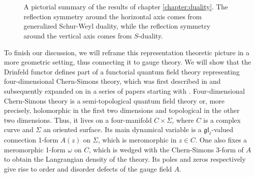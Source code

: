 \documentclass[11pt]{report}
\theoremstyle{definition}
\theoremstyle{remark}
\theoremstyle{remark}
\begin{document}
\begin{figure}
\begin{center}
~\\~\\
\end{center}
\caption{A pictorial summary of the results of chapter \ref{chapter:duality}. The reflection symmetry around the horizontal axis comes from generalized Schur-Weyl duality, while the reflection symmetry around the vertical axis comes from $S$-duality.}
\label{figure:dualities}
\end{figure}

To finish our discussion, we will reframe this representation theoretic picture in a more geometric setting, thus connecting it to gauge theory. We will show that the Drinfeld functor defines part of a functorial quantum field theory representing four-dimensional Chern-Simons theory, which was first described in \cite{article:costello:2013} and subsequently expanded on in a series of papers starting with \cite{article:costello:2018}. Four-dimensional Chern-Simons theory is a semi-topological quantum field theory or, more precisely, holomorphic in the first two dimensions and topological in the other two dimensions. Thus, it lives on a four-manifold $C \times \Sigma$, where $C$ is a complex curve and $\Sigma$ an oriented surface. Its main dynamical variable is a $\mathfrak{gl}_\ell$-valued connection 1-form $A(z)$ on $\Sigma$, which is meromorphic in $z \in C$. One also fixes a meromorphic 1-form $\omega$ on $C$, which is wedged with the Chern-Simons 3-form of $A$ to obtain the Langrangian density of the theory. Its poles and zeros respectively give rise to order and disorder defects of the gauge field $A$.
\end{document}
